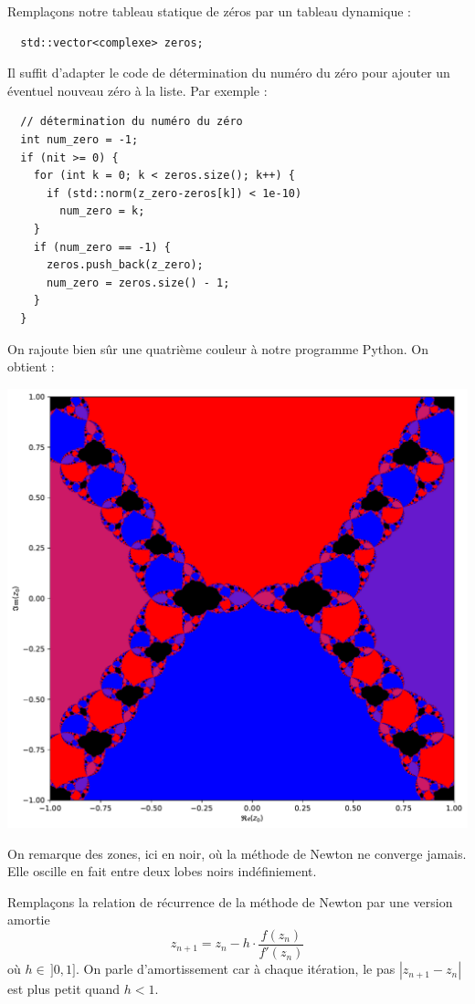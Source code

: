 \documentclass{book}
\begin{document}
\begin{correction}
Remplaçons notre tableau statique de zéros par un tableau dynamique :
\begin{verbatim}
  std::vector<complexe> zeros;
\end{verbatim}
Il suffit d'adapter le code de détermination du numéro du zéro pour ajouter un éventuel nouveau zéro à la liste. Par exemple :
\begin{verbatim}
  // détermination du numéro du zéro
  int num_zero = -1;
  if (nit >= 0) {
    for (int k = 0; k < zeros.size(); k++) {
      if (std::norm(z_zero-zeros[k]) < 1e-10)
        num_zero = k;
    }
    if (num_zero == -1) {
      zeros.push_back(z_zero);
      num_zero = zeros.size() - 1;
    }
  }
\end{verbatim}
On rajoute bien sûr une quatrième couleur à notre programme Python. On obtient :
\begin{center}
\includegraphics[width=0.7\linewidth]{TD2/newton_bassins_converg_z4_2z2_1.h1.pdf}
\end{center}
On remarque des zones, ici en noir, où la méthode de Newton ne converge jamais. Elle oscille en fait entre deux lobes noirs indéfiniement.
\end{correction}

Remplaçons la relation de récurrence de la méthode de Newton par une version amortie
\begin{equation*}
z_{n+1} = z_n - h\cdot\frac{f(z_n)}{f'(z_n)}
\end{equation*}
où $h\in\,]0,1]$. On parle d'amortissement car à chaque itération, le pas $|z_{n+1}-z_n|$ est plus petit quand $h<1$.\\
\end{document}
